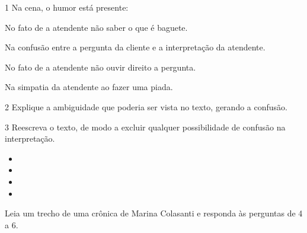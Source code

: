 \num{1} Na cena, o humor está presente:

\begin{escolha}
\item No fato de a atendente não saber o que é baguete.
\item Na confusão entre a pergunta da cliente e a interpretação da
atendente. 
\item No fato de a atendente não ouvir direito a pergunta.
\item Na simpatia da atendente ao fazer uma piada.
\end{escolha}


\num{2} Explique a ambiguidade que poderia ser vista no texto, gerando a
confusão.


\num{3} Reescreva o texto, de modo a excluir qualquer possibilidade de
confusão na interpretação.

\begin{itemize}[label=$\ast$]
\item {}
\item {}
\item {}
\item {}
\end{itemize}

Leia um trecho de uma crônica de Marina Colasanti e responda às
perguntas de 4 a 6.

